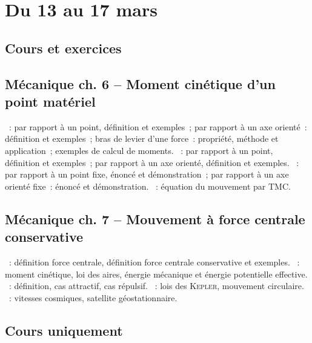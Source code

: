 \documentclass[a4paper, 12pt, final, garamond]{book}
\begin{document}
\setcounter{chapter}{20}

\chapter{Du 13 au 17 mars}

\section{Cours et exercices}
\section*{Mécanique ch. 6 -- Moment cinétique d'un point matériel}
\begin{enumerate}[label=\Roman*]
    ~: par rapport à un point, définition et exemples~;
        par rapport à un axe orienté~: définition et exemples~; bras de levier
        d'une force~: propriété, méthode et application~; exemples de calcul de
        moments.
    ~: par rapport à un point, définition et exemples~;
        par rapport à un axe orienté, définition et exemples.
    ~: par rapport à un point fixe, énoncé et
        démonstration~; par rapport à un axe orienté fixe~: énoncé et
        démonstration.
    ~: équation du mouvement par TMC.
\end{enumerate}

\section*{Mécanique ch. 7 -- Mouvement à force centrale conservative}
\begin{enumerate}[label=\Roman*]
    ~: définition force centrale,
        définition force centrale conservative et exemples.
    ~: moment cinétique, loi des aires, énergie
        mécanique et énergie potentielle effective.
    ~: définition, cas attractif, cas répulsif.
    ~: lois des \textsc{Kepler}, mouvement circulaire.
    ~: vitesses cosmiques, satellite
        géostationnaire.
\end{enumerate}

\section{Cours uniquement}
\end{document}

